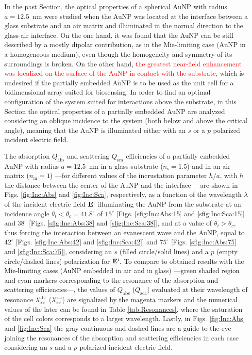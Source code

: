 
In the past Section, the optical properties of a spherical AuNP with radius $a = 12.5$~nm were studied when the AuNP was located at the interface between a glass substrate and an air matrix and illuminated in the normal direction to the glass-air interface. On the one hand, it was found that the AuNP can be still described by a mostly dipolar contribution, as in the Mie-limiting case (AuNP in a homogeneous medium), even though the homogeneity and symmetry of its surroundings is broken. On the other hand, \textcolor{red}{the greatest near-field enhancement was localized on  the surface of the AuNP in contact with the substrate}, which is undesired if the partially embedded AuNP is to be used as the unit cell for a bidimensional array suited for biosensing. In order to find an optimal configuration of the system suited for interactions above the substrate, in this Section the optical properties of a partially embedded AuNP are analyzed considering an oblique incidence to the system (both below and above the critical angle), meaning that the AuNP is illuminated either with an $s$ or a $p$ polarized incident electric field.

The absorption $Q_\text{abs}$ and scattering $Q_\text{sca}$ efficiencies of a partially embedded  AuNP with radius $a =12.5$~nm in a glass substrate ($n_\text{s} = 1.5$) and in an air matrix ($n_\text{m} = 1$) ---for different values of the incrustation parameter $h/a$, with $h$ the distance between the center of the AuNP and the interface--- are shown in Figs. \ref{fig:Inc:Abs} and \ref{fig:Inc:Sca}, respectively, as a function of the wavelength $\lambda$ of the incident electric field $\vb{E}^\text{i}$ illuminating the AuNP from the substrate at an incidence angle $\theta_i < \theta_c = 41.8^\circ$ of $15^\circ$ [Figs. \ref{sfig:Inc:Abs:15} and \ref{sfig:Inc:Sca:15}] and  $38^\circ$ [Figs. \ref{sfig:Inc:Abs:38} and \ref{sfig:Inc:Sca:38}], and  at a value of $\theta_i>\theta_c$, thus forcing the interaction between an evanescent wave and the AuNP, equal to $42^\circ$  [Figs. \ref{sfig:Inc:Abs:42} and \ref{sfig:Inc:Sca:42}] and $75^\circ$  [Figs. \ref{sfig:Inc:Abs:75} and \ref{sfig:Inc:Sca:75}], considering an $s$ (filled circle/solid lines) and a $p$ (empty circle/dashed lines) polarization for $\vb{E}^\text{i}$. To compare to obtained results with the Mie-limiting cases (AuNP embedded in air and in glass) ---green shaded region and cyan markers corresponding to the resonance of the absorption and scattering efficiencies---, the values of $Q_\text{abs}$ ($Q_\text{sca}$) evaluated at their wavelength of resonance $\lambda_\text{res}^\text{abs}$ ($\lambda_\text{res}^\text{sca}$) are signalized by the magenta markers and the numerical values of the later can be found in Table \ref{tab:Resonances}, where the saturation of the cell colors corresponds to a larger wavelength. Lastly, in Figs. \ref{fig:Inc:Abs} and \ref{fig:Inc:Sca} the gray continuous and dashed lines are a guide to the eye joining the resonances of the absorption and scattering efficiencies in each case considering an $s$ and a $p$ polarized incident electric field.


